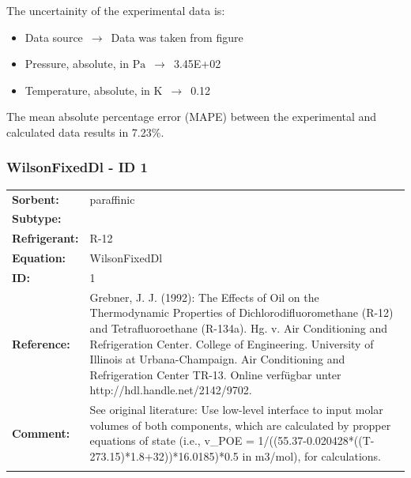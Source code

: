 The uncertainity of the experimental data is:
\begin{itemize}
\item Data source $\,\to\,$ Data was taken from figure
\item Pressure, absolute, in $\si{\pascal}$ $\,\to\,$ 3.45E+02
\item Temperature, absolute, in $\si{\kelvin}$ $\,\to\,$ 0.12
\end{itemize}

The mean absolute percentage error (MAPE) between the experimental and calculated data results in 7.23\%.
\FloatBarrier
\newpage
\subsubsection{WilsonFixedDl - ID 1}
%
\begin{tabular}[l]{|lp{11.5cm}|}
\hline
\addlinespace

\textbf{Sorbent:} & paraffinic \\
\textbf{Subtype:} &  \\
\textbf{Refrigerant:} & R-12 \\
\textbf{Equation:} & WilsonFixedDl \\
\textbf{ID:} & 1 \\
\textbf{Reference:} & Grebner, J. J. (1992): The Effects of Oil on the Thermodynamic Properties of Dichlorodifluoromethane (R-12) and Tetrafluoroethane (R-134a). Hg. v. Air Conditioning and Refrigeration Center. College of Engineering. University of Illinois at Urbana-Champaign. Air Conditioning and Refrigeration Center TR-13. Online verfügbar unter http://hdl.handle.net/2142/9702. \\
\textbf{Comment:} & See original literature: Use low-level interface to input molar volumes of both components, which are calculated by propper equations of state (i.e., v\_POE =  1/((55.37-0.020428*((T-273.15)*1.8+32))*16.0185)*0.5 in m3/mol), for calculations. \\

\addlinespace
\hline
\end{tabular}
\newline

